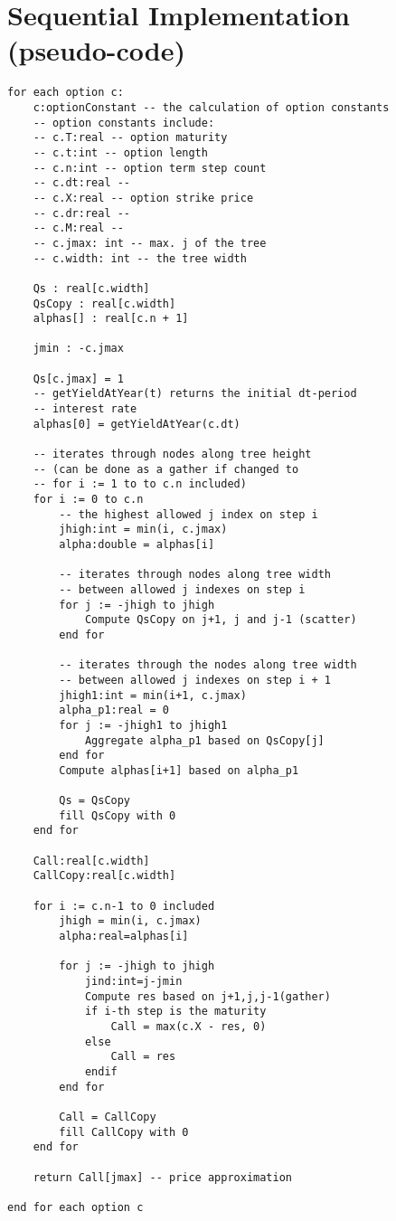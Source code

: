 \chapter{Sequential Implementation (pseudo-code)}
\begin{lstlisting}
for each option c:
    c:optionConstant -- the calculation of option constants
    -- option constants include:
    -- c.T:real -- option maturity
    -- c.t:int -- option length
    -- c.n:int -- option term step count
    -- c.dt:real -- 
    -- c.X:real -- option strike price
    -- c.dr:real --
    -- c.M:real -- 
    -- c.jmax: int -- max. j of the tree
    -- c.width: int -- the tree width
    
    Qs : real[c.width]
    QsCopy : real[c.width] 
    alphas[] : real[c.n + 1]
    
    jmin : -c.jmax
    
    Qs[c.jmax] = 1
    -- getYieldAtYear(t) returns the initial dt-period 
    -- interest rate
    alphas[0] = getYieldAtYear(c.dt) 
    
    -- iterates through nodes along tree height 
    -- (can be done as a gather if changed to 
    -- for i := 1 to to c.n included) 
    for i := 0 to c.n
        -- the highest allowed j index on step i
        jhigh:int = min(i, c.jmax)
        alpha:double = alphas[i]
        
        -- iterates through nodes along tree width
        -- between allowed j indexes on step i
        for j := -jhigh to jhigh
            Compute QsCopy on j+1, j and j-1 (scatter)
        end for
        
        -- iterates through the nodes along tree width
        -- between allowed j indexes on step i + 1
        jhigh1:int = min(i+1, c.jmax) 
        alpha_p1:real = 0
        for j := -jhigh1 to jhigh1
            Aggregate alpha_p1 based on QsCopy[j] 
        end for
        Compute alphas[i+1] based on alpha_p1
        
        Qs = QsCopy
        fill QsCopy with 0
    end for 
    
    Call:real[c.width]
    CallCopy:real[c.width]  
    
    for i := c.n-1 to 0 included
        jhigh = min(i, c.jmax)
        alpha:real=alphas[i]
        
        for j := -jhigh to jhigh
            jind:int=j-jmin
            Compute res based on j+1,j,j-1(gather)
            if i-th step is the maturity
                Call = max(c.X - res, 0)
            else
                Call = res
            endif    
        end for
        
        Call = CallCopy
        fill CallCopy with 0
    end for

    return Call[jmax] -- price approximation
    
end for each option c
\end{lstlisting}